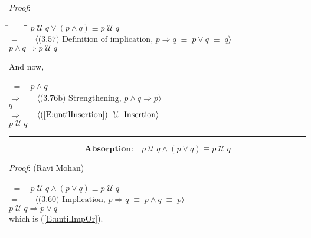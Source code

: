 \documentclass[12pt, fleqn, leqno]{article}
\newcommand{\lgap}{2pt}                             %
\newcommand{\mymathindent}{24pt}                    %
\newcommand{\equivs}{\ensuremath{\;\equiv\;}}       %
\newcommand{\impl}{\ensuremath{\Rightarrow}}        %
\newcommand{\Until}{\;\mathcal{U}\;}
\newcommand{\myqed}{\rule[-.23ex]{1.2ex}{2.0ex}}
\newcommand{\myqedtab}{\hspace{384pt}}              %
\newcommand{\Gll} {\langle}                         %
\newcommand{\Ggg} {\rangle}                         %
\newcommand{\Hint}[1]     {\ \ \ $\Gll              \mbox{#1} \Ggg$ }   %
\begin{document}
\emph{Proof}:
\begin{tabbing}
\hspace{\mymathindent} \= $= \;$ \= \myqedtab \= \kill
  \> \>   $p \Until q \lor (p \land q) \equiv p \Until q$\\[\lgap]
  \> $=$  \>  \Hint{(3.57) Definition of implication, $p\impl q\equivs p\lor q \equivs q$}\\[\lgap]
  \> \>   $p \land q \impl p \Until q$
\end{tabbing}
And now,
\begin{tabbing}
\hspace{\mymathindent} \= $= \;$ \= \myqedtab \= \kill
  \> \>   $p \land q $\\[\lgap]
  \> $\impl$ \> \Hint{(3.76b) Strengthening, $p\land q \impl p$} \\[\lgap]
  \> \>   $q$\\[\lgap]
  \> $\impl$ \> \Hint{(\ref{E:untilInsertion}) $\Until$ Insertion} \\[\lgap]
  \> \>   $p \Until q$ \quad \myqed
\end{tabbing}
%
\begin{equation}\label{E:untilAndOr}
\textbf{Absorption:}\quad p \Until q \land (p \lor q) \equiv p \Until q
\end{equation}

\emph{Proof}: (Ravi Mohan)
\begin{tabbing}
\hspace{\mymathindent} \= $= \;$ \= \myqedtab \= \kill
  \> \>   $p \Until q \land (p \lor q) \equiv p \Until q$\\[\lgap]
  \> $=$  \>  \Hint{(3.60) Implication, $p\impl q \equivs p\land q \equivs p$}\\[\lgap]
  \> \>   $p \Until q \impl p \lor q$\\[\lgap]
  \> which is (\ref{E:untilImpOr}). \quad \myqed
\end{tabbing}
\end{document}

